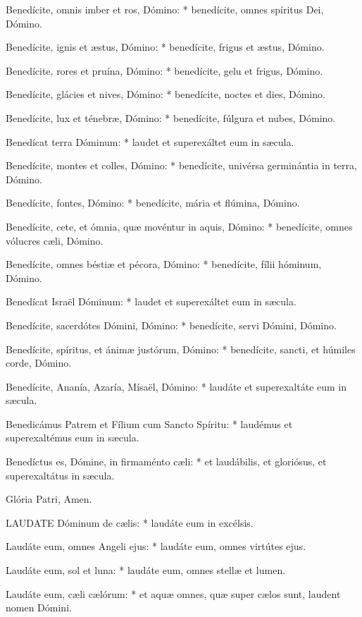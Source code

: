 Benedícite, omnis imber et ros, Dómino: * benedícite, omnes spíritus Dei, Dómino.

Benedícite, ignis et æstus, Dómino: * benedícite, frigus et æstus, Dómino.

Benedícite, rores et pruína, Dómino: * benedícite, gelu et frigus, Dómino.

Benedícite, glácies et nives, Dómino: * benedícite, noctes et dies, Dómino.

Benedícite, lux et ténebræ, Dómino: * benedícite, fúlgura et nubes, Dómino.

Benedícat terra Dóminum: * laudet et superexáltet eum in sæcula.

Benedícite, montes et colles, Dómino: * benedícite, univérsa germinántia in terra, Dómino.

Benedícite, fontes, Dómino: * benedícite, mária et flúmina, Dómino.

Benedícite, cete, et ómnia, quæ movéntur in aquis, Dómino: * benedícite, omnes vólucres cæli, Dómino.

Benedícite, omnes béstiæ et pécora, Dómino: * benedícite, fílii hóminum, Dómino.

Benedícat Israël Dóminum: * laudet et superexáltet eum in sæcula.

Benedícite, sacerdótes Dómini, Dómino: * benedícite, servi Dómini, Dómino.

Benedícite, spíritus, et ánimæ justórum, Dómino: * benedícite, sancti, et húmiles corde, Dómino.

Benedícite, Ananía, Azaría, Mísaël, Dómino: * laudáte et superexaltáte eum in sæcula.

Benedicámus Patrem et Fílium cum Sancto Spíritu: * laudémus et superexaltémus eum in sæcula.

Benedíctus es, Dómine, in firmaménto cæli: * et laudábilis, et gloriósus, et superexaltátus in sæcula.

 Glória Patri,  Amen.


\lettrine[lines=2]{L}{AUDATE} Dóminum de cælis: * laudáte eum in excélsis.

Laudáte eum, omnes Angeli ejus: * laudáte eum, omnes virtútes ejus.

Laudáte eum, sol et luna: * laudáte eum, omnes stellæ et lumen.

Laudáte eum, cæli cælórum: * et aquæ omnes, quæ super cælos sunt, laudent nomen Dómini.

